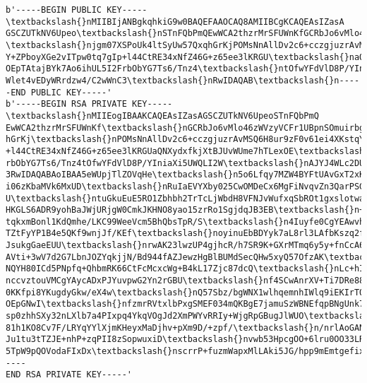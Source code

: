 \documentclass[11pt]{article}
\begin{document}
    \begin{Verbatim}[commandchars=\\\{\}]
b'-----BEGIN PUBLIC KEY-----\textbackslash{}nMIIBIjANBgkqhkiG9w0BAQEFAAOCAQ8AMIIBCgKCAQEAsIZasA
GSCZUTkNV6Upeo\textbackslash{}nSTnFQbPmQEwWCA2thzrMrSFUWnKfGCRbJo6vMlo46zWVzyVCFr1UBpnSOmuirbg6
\textbackslash{}njgm07XSPoUk4ltSyUw57QxqhGrKjPOMsNnAllDv2c6+cczgjuzrAvMSQ6H8ur9zF\textbackslash{}n0v61ei4XKstq
Y+ZPboyXGe2vITpw0tq7gIp+l44CtRE34xNfZ46G+z65ee3lKRGU\textbackslash{}naQNXydxfkjXtBJUvWUme7hTLex
OEpTAtajBYk7Ao6ihUL5I2FrbObYG7Ts6/Tnz4\textbackslash{}ntOfwYFdVlD8P/YIniaXi5UWQLI2WAJYJ4WLc2DUE
Wlet4vEDyWRrdzw4/C2wWnC3\textbackslash{}nRwIDAQAB\textbackslash{}n-----END PUBLIC KEY-----'
b'-----BEGIN RSA PRIVATE KEY-----\textbackslash{}nMIIEogIBAAKCAQEAsIZasAGSCZUTkNV6UpeoSTnFQbPmQ
EwWCA2thzrMrSFUWnKf\textbackslash{}nGCRbJo6vMlo46zWVzyVCFr1UBpnSOmuirbg6jgm07XSPoUk4ltSyUw57Qxq
hGrKj\textbackslash{}nPOMsNnAllDv2c6+cczgjuzrAvMSQ6H8ur9zF0v61ei4XKstqY+ZPboyXGe2vITpw\textbackslash{}n0tq7gIp
+l44CtRE34xNfZ46G+z65ee3lKRGUaQNXydxfkjXtBJUvWUme7hTLexOE\textbackslash{}npTAtajBYk7Ao6ihUL5I2F
rbObYG7Ts6/Tnz4tOfwYFdVlD8P/YIniaXi5UWQLI2W\textbackslash{}nAJYJ4WLc2DUEWlet4vEDyWRrdzw4/C2wWnC
3RwIDAQABAoIBAA5eWUpjTlZOVqHe\textbackslash{}n5o6Lfqy7MZW4BYFtUAvGxT2xKRDcmiekldOavfqk+ZjBJEns+
i06zKbaMVk6MxUD\textbackslash{}nRuIaEVYXby025CwOMDeCx6MgFiNvqvZn3QarPSGPPlfTC6v9+t+cDbiDP0X+QAd
U\textbackslash{}ntuGkuEuE5RO1Zbhbh2TrTcLjWbdH8VFNJvWufxqSbROt1gxslotwaHWqApivyvnK\textbackslash{}n0JISQx8MAbm
HKGLS6ADR9yohBaJWjURjgW0CmkJKHNO8yao15zrRo1SgjdqJB3EB\textbackslash{}n+p6PfUaI1A09LGA1KbXe/DNvH
tqkxmBonl1KdQmhe/LKC99WeeVcm5BhQbsTpR/S\textbackslash{}n4Iuyfe0CgYEAwvhZpoMd6t9V/+cgxP7eGWzxv/x
TZtFyYP1B4e5QKf9wnjJf/KEf\textbackslash{}noyinuEbBDYyk7aL8rl3LAfbKszq2fcbEYf556miVtasAaUAhtotj1
JsukgGaeEUU\textbackslash{}nrwAK23lwzUP4gjhcR/h7SR9K+GXrMTmq6y5y+fnCcA6URFPH6HrC570CgYEA58fq\textbackslash{}ns
AVti+3wV7d2G7LbnJOZYqkjjN/Bd944fAZJewzHgBlBUMdSecQHw5xyQ57OfzAK\textbackslash{}ndvJtrMmj7kA1CUU
NQYH80ICd5PNpfq+QhbmRK66CtFcMcxcWg+B4kL17Zjc87dcQ\textbackslash{}nLc+hIb2hFy6lvahroKoN8Du2tU3cI
nccvztouVMCgYAycADxPJYuvpwG2Yn2rGBU\textbackslash{}nf4SCwAnrXV+Ti7DRe88tLjG6GxoNxrjigo/w8gzbLnk
0KKfpi8YKugdyGkw/eX4w\textbackslash{}nQ57Sbz/bgWNX1wlhqemnhIWlq9iEKIrTQtWMNXxi/aR6O45T6AosvnWsk
OEpGNwI\textbackslash{}nfzmrRVtxlbPxgSMEF034mQKBgE7jamuSzWBNEfqpBNgUnk7CpfhAnUr7dXv49Lyx\textbackslash{}n3xy0k
sp0zhhSXy32nLXlb7a4PIxpq4YkqVOgJd2XmPWYvRRIy+WjgRpGBugJlWUO\textbackslash{}nbeyyLuZ2olQhzZYBNsf
81h1KO8Cv7F/LRYqYYlXjmKHeyxMaDjhv+pXm9D/+zpf/\textbackslash{}n/nrlAoGANlh7uiawCiHxJDr/TD9OGjZh0
Ju1tu3tTZJE+nhP+zqPII8zSopwuxiD\textbackslash{}nvwb53HpcgOO+6lru0OO33LRk7zcb3QQ5p6QQzlTXR9lr7Ul
5TpW9pQOVodaFIxDx\textbackslash{}nscrrP+fuzmWapxMlLAki5JG/hpp9mEmtgefixmRc+xKt0AOXSJQ=\textbackslash{}n-----
END RSA PRIVATE KEY-----'
    \end{Verbatim}
\end{document}
